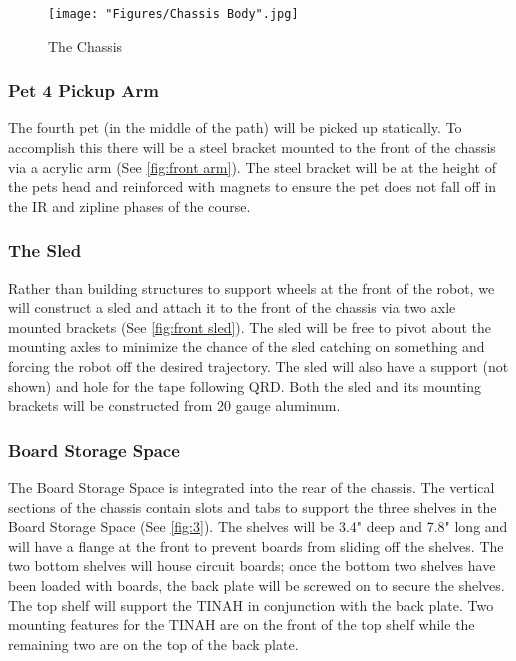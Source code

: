\documentclass[11pt, oneside]{article} %
\begin{document}
	\begin{figure}[h]
		\centering
		\texttt{[image: "Figures/Chassis Body".jpg]}
		\caption[Chassis]{The Chassis}
		\label{fig:1}
	\end{figure}

		\subsubsection{Pet 4 Pickup Arm}
		The fourth pet (in the middle of the path) will be picked up statically. To accomplish this there will be a steel bracket mounted to the front of the chassis via a acrylic arm (See \autoref{fig:front arm}). The steel bracket will be at the height of the pets head and reinforced with magnets to ensure the pet does not fall off in the IR and zipline phases of the course.
	
		\subsubsection{The Sled}
		Rather than building structures to support wheels at the front of the robot, we will construct a sled and attach it to the front of the chassis via two axle mounted brackets (See \autoref{fig:front sled}). The sled will be free to pivot about the mounting axles to minimize the chance of the sled catching on something and forcing the robot off the desired trajectory. The sled will also have a support (not shown) and hole for the tape following QRD. Both the sled and its mounting brackets will be constructed from 20 gauge aluminum.
		
		\subsubsection{Board Storage Space}

		The Board Storage Space is integrated into the rear of the chassis. The vertical sections of the chassis contain slots and tabs to support the three shelves in the Board Storage Space (See \autoref{fig:3}). The shelves will be 3.4" deep and 7.8" long and will have a flange at the front to prevent boards from sliding off the shelves. The two bottom shelves will house circuit boards; once the bottom two shelves have been loaded with boards, the back plate will be screwed on to secure the shelves. The top shelf will support the TINAH in conjunction with the back plate. Two mounting features for the TINAH are on the front of the top shelf while the remaining two are on the top of the back plate.
			
\end{document}
